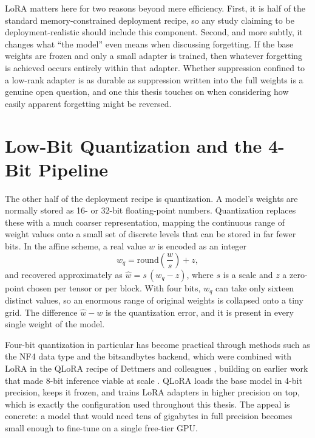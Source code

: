\documentclass[a4paper,12pt]{report}
\begin{document}
LoRA matters here for two reasons beyond mere efficiency. First, it is half of the standard memory-constrained deployment recipe, so any study claiming to be deployment-realistic should include this component. Second, and more subtly, it changes what ``the model'' even means when discussing forgetting. If the base weights are frozen and only a small adapter is trained, then whatever forgetting is achieved occurs entirely within that adapter. Whether suppression confined to a low-rank adapter is as durable as suppression written into the full weights is a genuine open question, and one this thesis touches on when considering how easily apparent forgetting might be reversed.
\section{Low-Bit Quantization and the 4-Bit Pipeline}
\label{sec:bg-quant}
The other half of the deployment recipe is quantization. A model's weights are normally stored as 16- or 32-bit floating-point numbers. Quantization replaces these with a much coarser representation, mapping the continuous range of weight values onto a small set of discrete levels that can be stored in far fewer bits. In the affine scheme, a real value $w$ is encoded as an integer
\begin{equation}
	w_q = \mathrm{round}\!\left(\frac{w}{s}\right) + z,
	\label{eq:quant}
\end{equation}
and recovered approximately as $\hat{w} = s\,(w_q - z)$, where $s$ is a scale and $z$ a zero-point chosen per tensor or per block. With four bits, $w_q$ can take only sixteen distinct values, so an enormous range of original weights is collapsed onto a tiny grid. The difference $\hat{w} - w$ is the quantization error, and it is present in every single weight of the model.

Four-bit quantization in particular has become practical through methods such as the NF4 data type and the bitsandbytes backend, which were combined with LoRA in the QLoRA recipe of Dettmers and colleagues \parencite{dettmers2023qlora}, building on earlier work that made 8-bit inference viable at scale \parencite{dettmers2022int8}. QLoRA loads the base model in 4-bit precision, keeps it frozen, and trains LoRA adapters in higher precision on top, which is exactly the configuration used throughout this thesis. The appeal is concrete: a model that would need tens of gigabytes in full precision becomes small enough to fine-tune on a single free-tier GPU.
\end{document}
